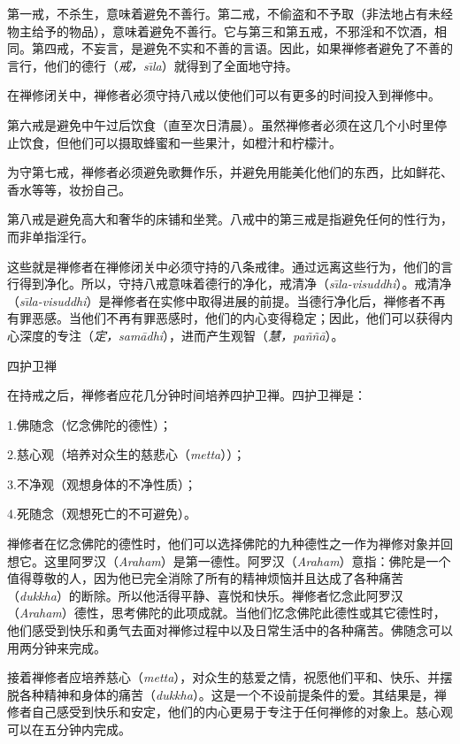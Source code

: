第一戒，不杀生，意味着避免不善行。第二戒，不偷盗和不予取（非法地占有未经物主给予的物品），意味着避免不善行。它与第三和第五戒，不\1邪淫和不饮酒，相同。第四戒，不妄言，是避免不实和不善的言语。因此，如果禅修者避免了不善的言行，他们的德行（{\it 戒，s\=\i la}）就得到了全面地守持。

在禅修闭关中，禅修者必须守持八戒以使他们可以有更多的时间投入到禅修中。

第六戒是避免中午过后饮食（直至次日清晨）。虽然禅修者必须在这几个小时里停止饮食，但他们可以摄取蜂蜜和一些果汁，如橙汁和柠檬汁。

为守第七戒，禅修者必须避免歌舞作乐，并避免用能美化他们的东西，比如鲜花、香水等等，妆扮自己。

第八戒是避免高大和奢华的床铺和坐凳。八戒中的第三戒是指避免任何的性行为，而非单指淫行。

这些就是禅修者在禅修闭关中必须守持的八条戒律。通过远离这些行为，他们的言行得到净化。所以，守持八戒意味着德行的净化，戒清净（{\it s\=\i la-visuddhi}）。戒清净（{\it s\=\i la-visuddhi}）是禅修者在实修中取得进展的前提。当德行净化后，禅修者不再有罪恶感。当他们不再有罪恶感时，他们的内心变得稳定；因此，他们可以获得内心深度的专注（{\it 定，sam\=adhi}），进而产生观智（{\it 慧，pa\~n\~n\=a}）。

\ssssubsectnonb \1四护卫禅

在持戒之后，禅修者应花几分钟时间培养四护卫禅。四护卫禅是：

{
\leftskip=1.6pc
\item{1.}佛随念（忆念佛陀的德性）；
\item{2.}慈心观（培养对众生的慈悲心（{\it metta}））；
\item{3.}不净观（观想身体的不净性质）；
\item{4.}死随念（观想死亡的不可避免）。

}

禅修者在忆念佛陀的德性时，他们可以选择佛陀的九种德性之一作为禅修对象并回想它。这里阿罗汉（{\it Araham}）是第一德性。阿罗汉（{\it Araham}）意指：佛陀是一个值得尊敬的人，因为他已完全消除了所有的精神烦恼并且达成了各种痛苦（{\it dukkha}）的断除。所以他活得平静、喜悦和快乐。禅修者忆念此阿罗汉（{\it Araham}）德性，思考佛陀的此项成就。当他们忆念佛陀此德性或其它德性时，他们感受到快乐和勇气去面对禅修过程中以及日常生活中的各种痛苦。佛随念可以用两分钟来完成。

接着禅修者应培养慈心（{\it metta}），对众生的慈爱之情，祝愿他们平和、快乐、并摆脱各种精神和身体的痛苦（{\it dukkha}）。这是一个不设前提条件的爱。其结果是，禅修者自己感受到快乐和安定，他们的内心更易于专注于任何禅修的对象上。慈心观可以在五分钟内完成。

